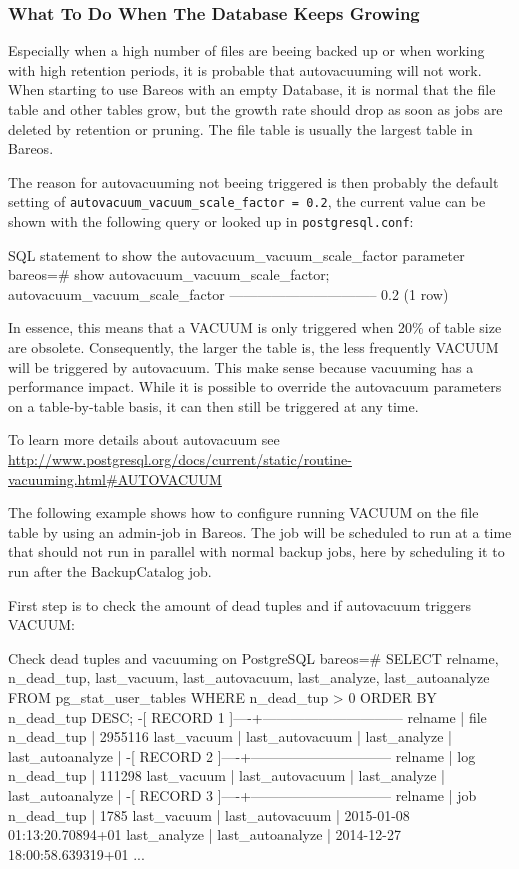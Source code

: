 \subsubsection{What To Do When The Database Keeps Growing}
\label{PostgresSize}
Especially when a high number of files are beeing backed up or when working with
high retention periods, it is probable that autovacuuming will not work.
When starting to use Bareos with an empty Database, it is normal that the file
table and other tables grow, but the growth rate should drop as soon as jobs are deleted by
retention or pruning. The file table is usually the largest table in Bareos.

The reason for autovacuuming not beeing triggered is then probably the default
setting of \texttt{autovacuum\_vacuum\_scale\_factor = 0.2}, the current value can
be shown with the following query or looked up in \texttt{postgresql.conf}:

\begin{commands}{SQL statement to show the autovacuum\_vacuum\_scale\_factor parameter}
bareos=# show autovacuum_vacuum_scale_factor;
 autovacuum_vacuum_scale_factor
 --------------------------------
  0.2
  (1 row)
\end{commands}

In essence, this means that a VACUUM is only triggered when 20\% of table size
are obsolete. Consequently, the larger the table is, the less frequently VACUUM
will be triggered by autovacuum. This make sense because vacuuming has a
performance impact. While it is possible to override the autovacuum parameters
on a table-by-table basis, it can then still be triggered at any time.

To learn more details about autovacuum see
\url{http://www.postgresql.org/docs/current/static/routine-vacuuming.html#AUTOVACUUM}

The following example shows how to configure running VACUUM on the file table by
using an admin-job in Bareos. The job will be scheduled to run at a time that should
not run in parallel with normal backup jobs, here by scheduling it to run after
the BackupCatalog job.

First step is to check the amount of dead tuples and if autovacuum triggers VACUUM:

\begin{commands}{Check dead tuples and vacuuming on PostgreSQL}
bareos=# SELECT relname, n_dead_tup, last_vacuum, last_autovacuum, last_analyze, last_autoanalyze
FROM pg_stat_user_tables WHERE n_dead_tup > 0 ORDER BY n_dead_tup DESC;
-[ RECORD 1 ]----+------------------------------
relname          | file
n_dead_tup       | 2955116
last_vacuum      |
last_autovacuum  |
last_analyze     |
last_autoanalyze |
-[ RECORD 2 ]----+------------------------------
relname          | log
n_dead_tup       | 111298
last_vacuum      |
last_autovacuum  |
last_analyze     |
last_autoanalyze |
-[ RECORD 3 ]----+------------------------------
relname          | job
n_dead_tup       | 1785
last_vacuum      |
last_autovacuum  | 2015-01-08 01:13:20.70894+01
last_analyze     |
last_autoanalyze | 2014-12-27 18:00:58.639319+01
...
\end{commands}


